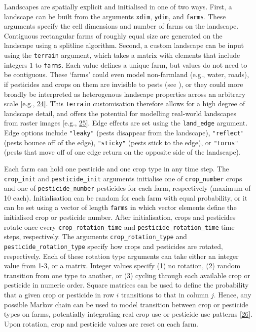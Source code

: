 \documentclass[10pt,letterpaper]{article}
\begin{document}
Landscapes are spatially explicit and initialised in one of two ways.
First, a landscape can be built from the arguments \texttt{xdim}, \texttt{ydim}, and \texttt{farms}.
These arguments specify the cell dimensions and number of farms on the landscape.
Contiguous rectangular farms of roughly equal size are generated on the landscape using a splitline algorithm.
Second, a custom landscape can be input using the \texttt{terrain} argument, which takes a matrix with elements that include integers 1 to \texttt{farms}.
Each value defines a unique farm, but values do not need to be contiguous.
These `farms' could even model non-farmland (e.g., water, roads), if pesticides and crops on them are invisible to pests (see ), or they could more broadly be interpreted as heterogenous landscape properties across an arbitrary scale {[}e.g., \protect\hyperlink{ref-Newman2023}{24}{]}.
This \texttt{terrain} customisation therefore allows for a high degree of landscape detail, and offers the potential for modelling real-world landscapes from raster images {[}e.g., \protect\hyperlink{ref-Millington2021}{25}{]}.
Edge effects are set using the \texttt{land\_edge} argument.
Edge options include \texttt{"leaky"} (pests disappear from the landscape), \texttt{"reflect"} (pests bounce off of the edge), \texttt{"sticky"} (pests stick to the edge), or \texttt{"torus"} (pests that move off of one edge return on the opposite side of the landscape).

Each farm can hold one pesticide and one crop type in any time step.
The \texttt{crop\_init} and \texttt{pesticide\_init} arguments initialise one of \texttt{crop\_number} crops and one of \texttt{pesticide\_number} pesticides for each farm, respectively (maximum of 10 each).
Initialisation can be random for each farm with equal probability, or it can be set using a vector of length \texttt{farms} in which vector elements define the initialised crop or pesticide number.
After initialisation, crops and pesticides rotate once every \texttt{crop\_rotation\_time} and \texttt{pesticide\_rotation\_time} time steps, respectively.
The arguments \texttt{crop\_rotation\_type} and \texttt{pesticide\_rotation\_type} specify how crops and pesticides are rotated, respectively.
Each of these rotation type arguments can take either an integer value from 1-3, or a matrix.
Integer values specify (1) no rotation, (2) random transition from one type to another, or (3) cycling through each available crop or pesticide in numeric order.
Square matrices can be used to define the probability that a given crop or pesticide in row \(i\) transitions to that in column \(j\).
Hence, any possible Markov chain can be used to model transition between crop or pesticide types on farms, potentially integrating real crop use or pesticide use patterns {[}\protect\hyperlink{ref-Zhang2020}{26}{]}.
Upon rotation, crop and pesticide values are reset on each farm.
\end{document}
